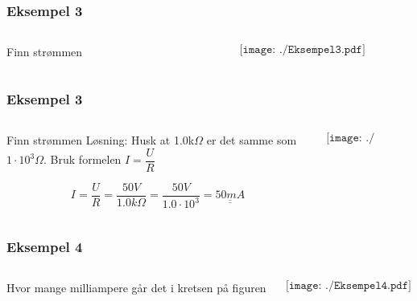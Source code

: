 \documentclass[aspectratio=169,xcolor=dvipsnames]{beamer}
\begin{document}
\begin{frame}
	\frametitle{Eksempel 3}

	\begin{columns}
		\begin{column}{0.5\textwidth}
Finn strømmen 
		\end{column}

		\begin{column}{0.5\textwidth}
			$$\texttt{[image: ./Eksempel3.pdf]}$$
		\end{column}
	\end{columns}
\end{frame}
\begin{frame}
	\frametitle{Eksempel 3}

	\begin{columns}
		\begin{column}{0.5\textwidth}
Finn strømmen 
\vskip 1cm
Løsning: Husk at 1.0k$\Omega$ er det samme som $1\cdot10^{3}\Omega$.
Bruk formelen $I=\dfrac{U}{R}$

\[
I=\dfrac{U}{R}=\dfrac{50V}{1.0k\Omega}=\dfrac{50V}{1.0\cdot10^{3}}=\underline{\underline{50mA}}
\]
		\end{column}

		\begin{column}{0.5\textwidth}
			$$\texttt{[image: ./Eksempel3.pdf]}$$
		\end{column}
	\end{columns}
\end{frame}


\begin{frame}
	\frametitle{Eksempel 4}

	\begin{columns}
		\begin{column}{0.5\textwidth}
Hvor mange milliampere går det i kretsen på figuren 
		\end{column}

		\begin{column}{0.5\textwidth}
			$$\texttt{[image: ./Eksempel4.pdf]}$$
		\end{column}
	\end{columns}
\end{frame}
\end{document}

